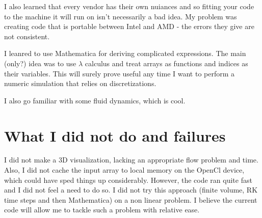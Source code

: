 \documentclass[paper=a4, fontsize=11pt]{scrartcl} %
\numberwithin{equation}{section} %
\numberwithin{figure}{section} %
\numberwithin{table}{section} %
\begin{document}
I also learned that every vendor has their own nuiances and so fitting your code to the machine it will run on isn't necessarily
a bad idea. My problem was creating code that is portable between Intel and AMD - the errors they give are not consistent.

I leanred to use Mathematica for deriving complicated expressions. The main (only?) idea was to use $\lambda$ calculus
and treat arrays as functions and indices as their variables. This will surely prove useful any time I want to perform a numeric
simulation that relies on discretizations.

I also go familiar with some fluid dynamics, which is cool.

\section{What I did not do and failures}
I did not make a 3D visualization, lacking an appropriate flow problem and time.
Also, I did not cache the input array to local memory on the OpenCl device, which 
could have sped things up considerably. However, the code ran quite fast and I did not feel a need to do so.
I did not try this approach (finite volume, RK time steps and then Mathematica) on a non linear problem. 
I believe the current code will allow me to tackle such a problem with relative ease.





\newpage
\end{document}
